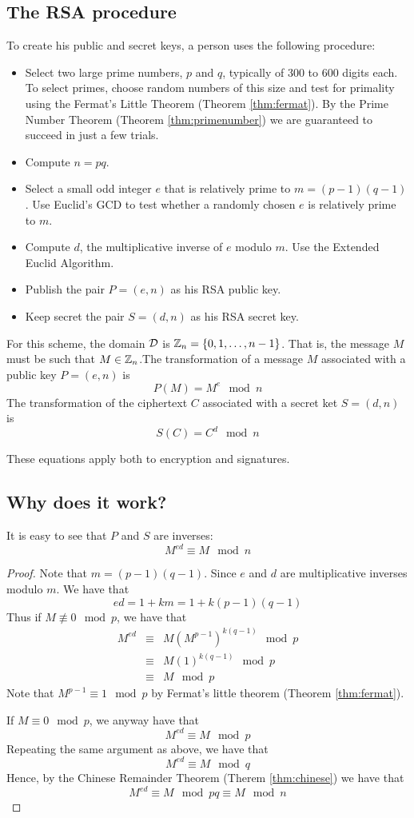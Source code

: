 \subsection{The RSA procedure}

To create his public and secret keys, a person uses the following procedure:

\begin{itemize}
\item Select two large prime numbers, $p$ and $q$, typically of 300 to 600 digits each. To select primes, choose random numbers of this size and test for primality using the Fermat's Little Theorem (Theorem \ref{thm:fermat}). By the Prime Number Theorem (Theorem \ref{thm:primenumber}) we are guaranteed to succeed in just a few trials.
\item Compute $n = pq$.
\item Select a small odd integer $e$ that is relatively prime to $m = (p-1)(q-1)$. Use Euclid's GCD to test whether a randomly chosen $e$ is relatively prime to $m$.
\item Compute $d$, the multiplicative inverse of $e$ modulo $m$.  Use the Extended Euclid Algorithm.
\item Publish the pair $P = (e,n)$ as his RSA public key.
\item Keep secret the pair $S = (d,n)$ as his RSA secret key.
\end{itemize}

For this scheme, the domain ${\cal D}$ is $\mathbb{Z}_n = \{0,1,\ldots,n-1\}$. That is,
the message $M$ must be such that $M \in  \mathbb{Z}_n$.The transformation of a message $M$ associated with a public key $P = (e,n)$ is \\
\[
P(M) = M^e \mod n
\]
The transformation of the ciphertext $C$ associated with a secret ket $S = (d,n)$ is \\
\[
S(C) = C^d \mod n
\]

These equations apply both to encryption and signatures.

\subsection{Why does it work?}
It is easy to see  that $P$ and $S$ are inverses:
\[
M^{ed} \equiv M \mod n
\]
\begin{proof}
Note that $m = (p-1)(q-1)$. Since $e$ and $d$ are multiplicative
inverses modulo $m$. We have that
\[
ed = 1 + km = 1 + k(p-1)(q-1)
\]
Thus if $M \not\equiv 0 \mod p$, we have that
\[
\begin{array}{lll}
M^{ed}  & \equiv & M(M^{p-1})^{k(q-1)} \mod p \\
        & \equiv & M(1)^{k(q-1)} \mod p  \\
        & \equiv & M \mod p 
\end{array}
\]
Note that $M^{p-1} \equiv 1 \mod p$ by Fermat's little theorem (Theorem \ref{thm:fermat}).

If $M \equiv 0 \mod p$, we anyway have that
\[
M^{ed} \equiv M \mod p
\]
Repeating the same argument as above, we have that
\[
M^{ed} \equiv M \mod q
\]
Hence, by the Chinese Remainder Theorem (Therem \ref{thm:chinese}) we have that
\[
M^{ed} \equiv M \mod pq \equiv M \mod n
\]
\end{proof}


